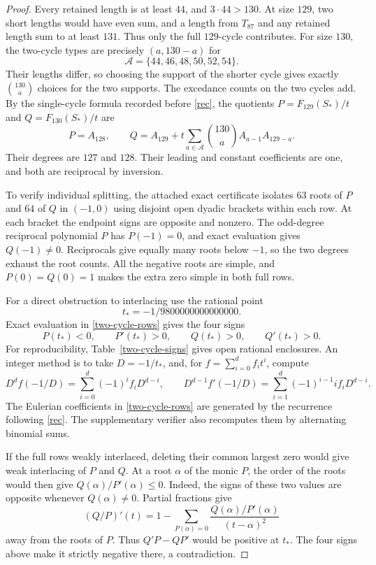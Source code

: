 \begin{proof}
Every retained length is at least $44$, and $3\cdot44>130$. At size $129$, two short lengths would have even sum, and a length from $T_{87}$ and any retained length sum to at least $131$. Thus only the full $129$-cycle contributes. For size $130$, the two-cycle types are precisely $(a,130-a)$ for
\[
 \mathcal A=\{44,46,48,50,52,54\}.
\]
Their lengths differ, so choosing the support of the shorter cycle gives exactly $\binom{130}{a}$ choices for the two supports. The excedance counts on the two cycles add. By the single-cycle formula recorded before \eqref{rec}, the quotients $P=F_{129}(S_\ast)/t$ and $Q=F_{130}(S_\ast)/t$ are
\begin{equation}\label{two-cycle-rows}
 P=A_{128},\qquad
 Q=A_{129}+t\sum_{a\in\mathcal A}\binom{130}{a}A_{a-1}A_{129-a}.
\end{equation}
Their degrees are $127$ and $128$. Their leading and constant coefficients are one, and both are reciprocal by inversion.

To verify individual splitting, the attached exact certificate isolates $63$ roots of $P$ and $64$ of $Q$ in $(-1,0)$ using disjoint open dyadic brackets within each row. At each bracket the endpoint signs are opposite and nonzero. The odd-degree reciprocal polynomial $P$ has $P(-1)=0$, and exact evaluation gives $Q(-1)\ne0$. Reciprocals give equally many roots below $-1$, so the two degrees exhaust the root counts. All the negative roots are simple, and $P(0)=Q(0)=1$ makes the extra zero simple in both full rows.

For a direct obstruction to interlacing use the rational point
\[
 t_\ast=-1/9800000000000000 .
\]
Exact evaluation in \eqref{two-cycle-rows} gives the four signs
\[
 P(t_\ast)<0,\qquad P'(t_\ast)>0,\qquad Q(t_\ast)>0,\qquad Q'(t_\ast)>0 .
\]
For reproducibility, Table~\ref{two-cycle-signs} gives open rational enclosures. An integer method is to take $D=-1/t_\ast$, and, for $f=\sum_{i=0}^d f_i t^i$, compute
\[
 D^d f(-1/D)=\sum_{i=0}^d(-1)^i f_i D^{d-i},\qquad
 D^{d-1}f'(-1/D)=\sum_{i=1}^d(-1)^{i-1}i f_i D^{d-i}.
\]
The Eulerian coefficients in \eqref{two-cycle-rows} are generated by the recurrence following \eqref{rec}. The supplementary verifier also recomputes them by alternating binomial sums.

If the full rows weakly interlaced, deleting their common largest zero would give weak interlacing of $P$ and $Q$. At a root $\alpha$ of the monic $P$, the order of the roots would then give $Q(\alpha)/P'(\alpha)\le0$. Indeed, the signs of these two values are opposite whenever $Q(\alpha)\ne0$. Partial fractions give
\[
 (Q/P)'(t)=1-\sum_{P(\alpha)=0}\frac{Q(\alpha)/P'(\alpha)}{(t-\alpha)^2}
\]
away from the roots of $P$. Thus $Q'P-QP'$ would be positive at $t_\ast$. The four signs above make it strictly negative there, a contradiction.
\end{proof}

